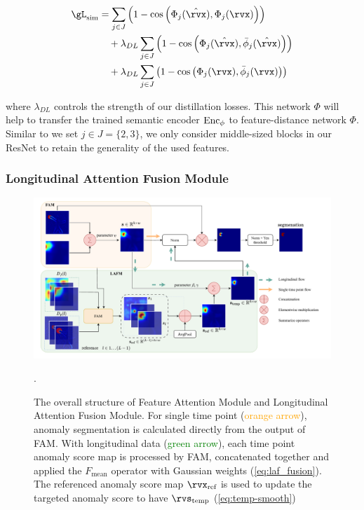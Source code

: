 \begin{align}
\gL_{\textnormal{sim}} &= \sum_{j \in J} \left( 1 - \cos\left(\Phi_j(\hat{\rvx}), \Phi_j(\rvx)\right) \right) \notag \\
&\quad + \lambda_{DL} \sum_{j \in J} \left( 1 - \cos\left(\Phi_j(\hat{\rvx}), \bar{\phi}_j(\hat{\rvx})\right) \right) \notag \\
&\quad + \lambda_{DL} \sum_{j \in J} \left( 1 - \cos\left(\Phi_j(\rvx), \bar{\phi}_j(\rvx)\right) \right) \label{eq:fe-dl-loss}
\end{align}

where $\lambda_{DL}$ controls the strength of our distillation losses. This network $\Phi$ will help to transfer the trained semantic encoder $\textnormal{Enc}_{\phi}$ to feature-distance network $\Phi$. Similar to \cite{DDAD, PatchCoretotalrecall} we set $j \in J = \{2, 3\}$, we only consider middle-sized blocks in our ResNet to retain the generality of the used features.

\subsubsection{Longitudinal Attention Fusion Module}
\label{sec:method-lafm}

\begin{figure}[htbp]
    \centering
    \includegraphics[width=0.95\linewidth]{figures/model-fam-lafm.pdf}
    \caption{The overall structure of Feature Attention Module and Longitudinal Attention Fusion Module. For single time point (\textcolor{orange}{orange arrow}), anomaly segmentation is calculated directly from the output of FAM. With longitudinal data (\textcolor{green}{green arrow}), each time point anomaly score map is processed by FAM, concatenated together and applied the $F_{\text{mean}}$ operator with Gaussian weights (\cref{eq:laf_fusion}). The referenced anomaly score map $\rvx_{\text{ref}}$ is used to update the targeted anomaly score to have $\rvs_{\text{temp}}$ (\cref{eq:temp-smooth})}. 
    \label{fig:model-fam-lafm}
\end{figure}

